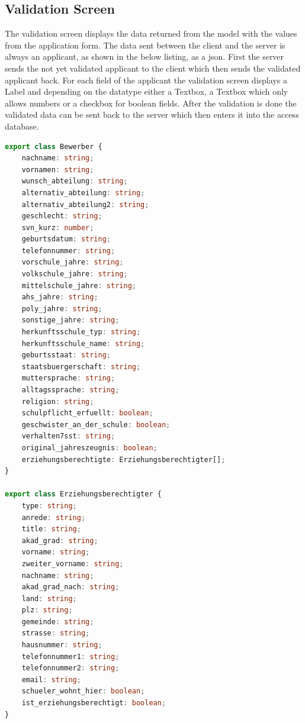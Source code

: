 \subsection{Validation Screen}

The validation screen displays the data returned from the model with the values from the application form.
The data sent between the client and the server is always an applicant, as shown in the below listing, as a json. First the server sends the not yet validated applicant to the client which then sends the validated applicant back.
For each field of the applicant the validation screen displays a Label and depending on the datatype either a Textbox, a Textbox which only allows numbers or a checkbox for boolean fields.
After the validation is done the validated data can be sent back to  the server which then enters it into the access database.


\begin{lstlisting}[language=typescript,caption=Classes for applicant(Bewerber) and legal guardian(Erziehungsberechtigter),label=lst:impl:applicantGuardian]
export class Bewerber {
    nachname: string;
    vornamen: string;
    wunsch_abteilung: string;
    alternativ_abteilung: string;
    alternativ_abteilung2: string;
    geschlecht: string;
    svn_kurz: number;
    geburtsdatum: string;
    telefonnummer: string;
    vorschule_jahre: string;
    volkschule_jahre: string;
    mittelschule_jahre: string;
    ahs_jahre: string;
    poly_jahre: string;
    sonstige_jahre: string;
    herkunftsschule_typ: string;
    herkunftsschule_name: string;
    geburtsstaat: string;
    staatsbuergerschaft: string;
    muttersprache: string;
    alltagssprache: string;
    religion: string;
    schulpflicht_erfuellt: boolean;
    geschwister_an_der_schule: boolean;
    verhalten7sst: string;
    original_jahreszeugnis: boolean;
    erziehungsberechtigte: Erziehungsberechtigter[];
}

export class Erziehungsberechtigter {
    type: string;
    anrede: string;
    title: string;
    akad_grad: string;
    vorname: string;
    zweiter_vorname: string;
    nachname: string;
    akad_grad_nach: string;
    land: string;
    plz: string;
    gemeinde: string;
    strasse: string;
    hausnummer: string;
    telefonnummer1: string;
    telefonnummer2: string;
    email: string;
    schueler_wohnt_hier: boolean;
    ist_erziehungsberechtigt: boolean;
}
\end{lstlisting}

